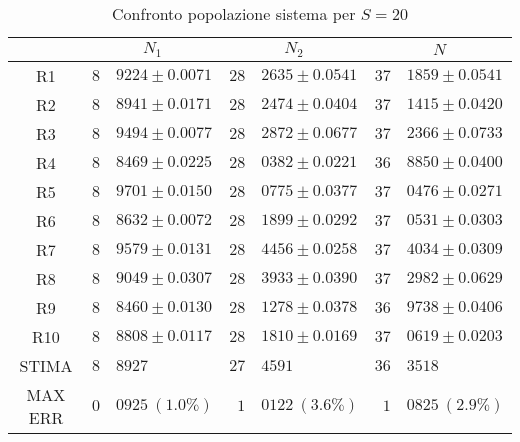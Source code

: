 \begin{table}[!h]
\begin{tabular}{c|r@{.}l|r@{.}l|r@{.}l}
& \multicolumn{2}{|c|}{$N_1$}
& \multicolumn{2}{|c|}{$N_2$}
& \multicolumn{2}{|c}{$N$} 
\\          
\hline
R1      & $8$&$9224 \pm 0.0071$ & $28$&$2635 \pm 0.0541$ & $37$&$1859 \pm 0.0541$ \\
R2      & $8$&$8941 \pm 0.0171$ & $28$&$2474 \pm 0.0404$ & $37$&$1415 \pm 0.0420$ \\
R3      & $8$&$9494 \pm 0.0077$ & $28$&$2872 \pm 0.0677$ & $37$&$2366 \pm 0.0733$ \\
R4      & $8$&$8469 \pm 0.0225$ & $28$&$0382 \pm 0.0221$ & $36$&$8850 \pm 0.0400$ \\
R5      & $8$&$9701 \pm 0.0150$ & $28$&$0775 \pm 0.0377$ & $37$&$0476 \pm 0.0271$ \\
R6      & $8$&$8632 \pm 0.0072$ & $28$&$1899 \pm 0.0292$ & $37$&$0531 \pm 0.0303$ \\
R7      & $8$&$9579 \pm 0.0131$ & $28$&$4456 \pm 0.0258$ & $37$&$4034 \pm 0.0309$ \\
R8      & $8$&$9049 \pm 0.0307$ & $28$&$3933 \pm 0.0390$ & $37$&$2982 \pm 0.0629$ \\
R9      & $8$&$8460 \pm 0.0130$ & $28$&$1278 \pm 0.0378$ & $36$&$9738 \pm 0.0406$ \\
R10     & $8$&$8808 \pm 0.0117$ & $28$&$1810 \pm 0.0169$ & $37$&$0619 \pm 0.0203$ \\
STIMA   & $8$&$8927$            & $27$&$4591$            & $36$&$3518$            \\
MAX ERR & $0$&$0925 \ (1.0\%)$  & $1$&$0122 \ (3.6\%)$   & $1$&$0825 \ (2.9\%)$     
\end{tabular}
\centering
\caption{Confronto popolazione sistema per $S=20$}
\label{tab:20_n}
\end{table}

